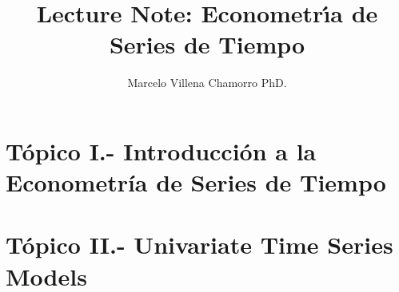 \documentclass{easyclass}
\begin{document}
\begin{titlepage}
    \title{Lecture Note: Econometr\'\i{}a de Series de Tiempo }
    \author{Marcelo Villena Chamorro PhD.}
    \maketitle
\end{titlepage}

\tableofcontents

\chapter{Tópico I.- Introducción a la Econometría de Series de Tiempo}

\chapter{Tópico II.- Univariate Time Series Models}



\end{document}
